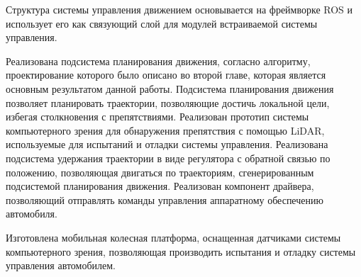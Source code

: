 Структура системы управления движением основывается на фреймворке ROS и использует его как связующий слой для модулей
встраиваемой системы управления.

Реализована подсистема планирования движения, согласно алгоритму, проектирование которого было описано во второй главе,
которая является основным результатом данной работы. Подсистема планирования движения позволяет планировать траектории,
позволяющие достичь локальной цели, избегая столкновения с препятствиями.
Реализован прототип системы компьютерного зрения для обнаружения препятствия с помощью LiDAR, используемые для
испытаний и отладки системы управления. Реализована подсистема удержания траектории в виде регулятора с обратной связью по положению,
позволяющая двигаться по траекториям, сгенерированным подсистемой планирования движения. Реализован компонент
драйвера, позволяющий отправлять команды управления аппаратному обеспечению автомобиля.

Изготовлена мобильная колесная платформа, оснащенная датчиками системы компьютерного зрения, позволяющая производить
испытания и отладку системы управления автомобилем.